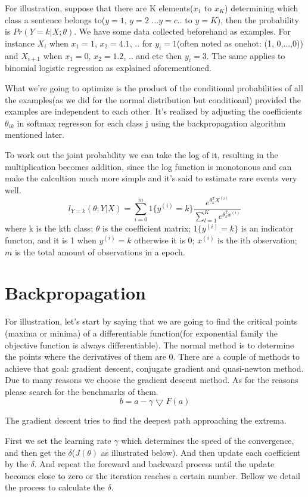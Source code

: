 \documentclass[a4paper]{article}
\begin{document}
For illustration, suppose that there are K elements($x_1$ to $x_K$) determining which class a sentence belongs to($y=1$, $y=2$ ...$y=c$.. to $y=K$), then the probability is $Pr(Y=k|X; \theta)$. We have some data collected beforehand as examples. For instance $X_i$ when $x_1 = 1$, $x_2 = 4.1$, .. for $y_i = 1$(often noted as onehot: (1, 0,...,0)) and $X_{i+1}$ when $x_1 = 0$, $x_2 = 1.2$, .. and etc then $y_i = 3$. The same applies to binomial logistic regression as explained aforementioned.

What we're going to optimize is the product of the conditional probabilities of all the examples(as we did for the normal distribution but conditioanl) provided the examples are independent to each other. It's realized by adjusting the coefficients $\theta_{ik}$ in softmax regresson for each class j using the backpropagation algorithm mentioned later. 

To work out the joint probability we can take the log of it, resulting in the multiplication becomes addition, since the log function is monotonous and can make the calcultion much more simple and it's said to estimate rare events very well. 
$$l_{Y=k}(\theta; Y|X) = \sum_{i=0}^m 1\{y^{(i)}=k\} \frac{e^{\theta_k^T X^{(i)}}}{\sum^K_{l=1}e^{\theta^T_kx^{(i)}}}$$ 
where k is the kth class; $\theta$ is the coefficient matrix; $1\{y^{(i)}=k\}$ is an indicator functon, and it is 1 when $y^{(i)}=k$ otherwise it is 0; $x^{(i)}$ is the ith observation; $m$ is the total amount of observations in a epoch.

\section{Backpropagation}
For illustration, let's start by saying that we are going to find the critical points (maxima or minima) of a differentiable function(for exponential family the objective function is always differentiable). The normal method is to determine the points where the derivatives of them are 0. There are a couple of methods to achieve that goal: gradient descent, conjugate gradient and quasi-newton method. Due to many reasons we choose the gradient descent method. As for the reasons please search for the benchmarks of them. 
$$b = a - \gamma \bigtriangledown F(a)$$

The gradient descent tries to find the deepest path approaching the extrema. 

First we set the learning rate $\gamma$ which determines the speed of the convergence, and then get the $\delta$($J(\theta)$ as illustrated below). And then update each coefficient by the $\delta$. And repeat the foreward and backward process until the update becomes close to zero or the iteration reaches a certain number. Bellow we detail the process to calculate the $\delta$.
\end{document}
